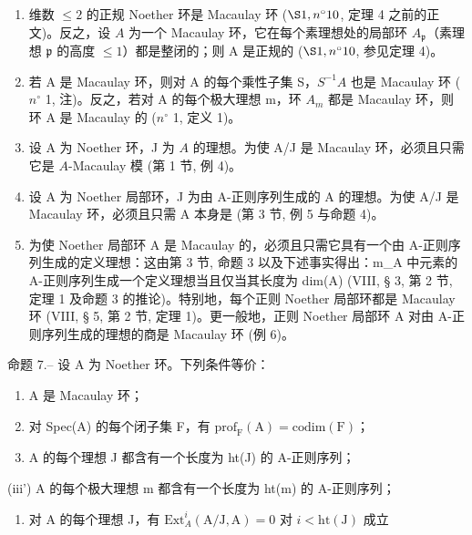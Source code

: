 \begin{enumerate}
\def\labelenumi{\arabic{enumi})}
\setcounter{enumi}{2}
\item
  维数 \(\leqslant 2\) 的正规 Noether 环是 Macaulay 环 (\(\S 1, n^{\circ} 10\), 定理 4 之前的正文)。反之，设 \(A\) 为一个 Macaulay 环，它在每个素理想处的局部环 \(A_{\mathfrak{p}}\)（素理想 \(\mathfrak{p}\) 的高度 \(\leqslant 1\)）都是整闭的；则 A 是正规的 (\(\S 1, n^{\circ} 10\), 参见定理 4)。
\item
  若 A 是 Macaulay 环，则对 A 的每个乘性子集 S，\(S^{-1}A\) 也是 Macaulay 环 (\(n^{\circ}\) 1, 注)。反之，若对 A 的每个极大理想 m，环 \(A_{m}\) 都是 Macaulay 环，则环 A 是 Macaulay 的 (\(n^{\circ}\) 1, 定义 1)。
\item
  设 A 为 Noether 环，J 为 \(A\) 的理想。为使 A/J 是 Macaulay 环，必须且只需它是 \(A\)-Macaulay 模 (第 1 节, 例 4)。
\item
  设 A 为 Noether 局部环，J 为由 A-正则序列生成的 A 的理想。为使 A/J 是 Macaulay 环，必须且只需 A 本身是 (第 3 节, 例 5 与命题 4)。
\item
  为使 Noether 局部环 A 是 Macaulay 的，必须且只需它具有一个由 A-正则序列生成的定义理想：这由第 3 节, 命题 3 以及下述事实得出：m\_A 中元素的 A-正则序列生成一个定义理想当且仅当其长度为 dim(A) (VIII, § 3, 第 2 节, 定理 1 及命题 3 的推论)。特别地，每个正则 Noether 局部环都是 Macaulay 环 (VIII, § 5, 第 2 节, 定理 1)。更一般地，正则 Noether 局部环 A 对由 A-正则序列生成的理想的商是 Macaulay 环 (例 6)。
\end{enumerate}

命题 7.-- 设 A 为 Noether 环。下列条件等价：

\begin{enumerate}
\def\labelenumi{(\roman{enumi})}
\item
  A 是 Macaulay 环；
\item
  对 Spec(A) 的每个闭子集 F，有 \(\mathrm{prof}_{\mathrm{F}}(\mathrm{A}) = \mathrm{codim}(\mathrm{F})\)；
\item
  A 的每个理想 J 都含有一个长度为 ht(J) 的 A-正则序列；
\end{enumerate}

(iii') A 的每个极大理想 m 都含有一个长度为 ht(m) 的 A-正则序列；

\begin{enumerate}
\def\labelenumi{(\roman{enumi})}
\setcounter{enumi}{3}
\tightlist
\item
  对 A 的每个理想 J，有 \(\mathrm{Ext}_A^i (\mathrm{A} / \mathrm{J},\mathrm{A}) = 0\) 对 \(i <   \mathrm{ht}(\mathrm{J})\) 成立
\end{enumerate}

